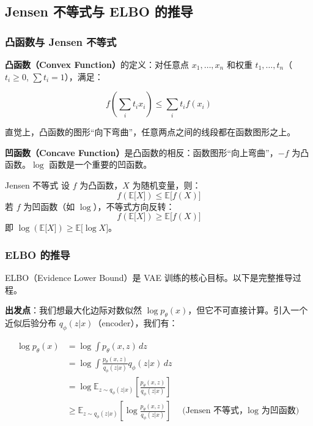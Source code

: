 \documentclass[a4paper]{article}
\begin{document}
\subsection{Jensen 不等式与 ELBO 的推导}

\subsubsection{凸函数与 Jensen 不等式}

\textbf{凸函数（Convex Function）}的定义：对任意点 $x_1, \ldots, x_n$ 和权重 $t_1, \ldots, t_n$（$t_i \geq 0$, $\sum t_i = 1$），满足：

$$f\left(\sum_i t_i x_i\right) \leq \sum_i t_i f(x_i)$$

直觉上，凸函数的图形``向下弯曲''，任意两点之间的线段都在函数图形之上。

\textbf{凹函数（Concave Function）}是凸函数的相反：函数图形``向上弯曲''，$-f$ 为凸函数。$\log$ 函数是一个重要的凹函数。

\begin{importantbox}{Jensen 不等式}
设 $f$ 为凸函数，$X$ 为随机变量，则：
$$f(\mathbb{E}{[}X{]}) \leq \mathbb{E}{[}f(X){]}$$
若 $f$ 为凹函数（如 $\log$），不等式方向反转：
$$f(\mathbb{E}{[}X{]}) \geq \mathbb{E}{[}f(X){]}$$
即 $\log(\mathbb{E}{[}X{]}) \geq \mathbb{E}{[}\log X{]}$。
\end{importantbox}

\subsubsection{ELBO 的推导}

ELBO（Evidence Lower Bound）是 VAE 训练的核心目标。以下是完整推导过程。

\textbf{出发点}：我们想最大化边际对数似然 $\log p_\theta(x)$，但它不可直接计算。引入一个近似后验分布 $q_\phi(z|x)$（encoder），我们有：

\begin{align}
\log p_\theta(x) &= \log \int p_\theta(x, z) \, dz \nonumber \\
&= \log \int \frac{p_\theta(x, z)}{q_\phi(z|x)} q_\phi(z|x) \, dz \nonumber \\
&= \log \mathbb{E}_{z \sim q_\phi(z|x)} \left[\frac{p_\theta(x, z)}{q_\phi(z|x)}\right] \nonumber \\
&\geq \mathbb{E}_{z \sim q_\phi(z|x)} \left[\log \frac{p_\theta(x, z)}{q_\phi(z|x)}\right] \quad \text{(Jensen 不等式，$\log$ 为凹函数)}
\end{align}
\end{document}
